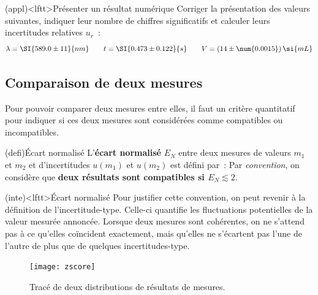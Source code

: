 \documentclass[../../main/main.tex]{subfiles}
\begin{document}
\begin{tcb*}(appl)<lftt>{Présenter un résultat numérique}
	Corriger la présentation des valeurs suivantes, indiquer leur nombre de
	chiffres significatifs et calculer leurs incertitudes relatives $u_r$~:
	\[
		\lambda = \SI{589.0\pm11}{nm}
		\qquad
		t = \SI{0.473 \pm 0.122}{s}
		\qquad
		V = (14 \pm \num{0.0015})\,\si{mL}
	\]
	\tcblower
\end{tcb*}

\subsection{Comparaison de deux mesures}
Pour pouvoir comparer deux mesures entre elles, il faut un critère quantitatif
pour indiquer si ces deux mesures sont considérées comme compatibles ou
incompatibles.
\begin{tcb*}(defi){Écart normalisé}
	L'\textbf{écart normalisé} $E_N$ entre deux mesures de valeurs $m_1$ et $m_2$ et d'incertitudes
	$u(m_1)$ et $u(m_2)$ est défini par~:
	\psw{%
		\[
			\boxed{E_N = \frac{\abs{m_1-m_2}}{\sqrt{u(m_1)^{2} + u(m_2)^{2}}}}
		\]
	}%
	Par \textit{convention}, on considère que \textbf{deux résultats sont
		compatibles si $E_N \lesssim 2$}.
\end{tcb*}


\begin{tcb}(inte)<lftt>{Écart normalisé}
	Pour justifier cette convention, on peut revenir à la définition de
	l'incertitude-type. Celle-ci quantifie les fluctuations potentielles de la
	valeur mesurée annoncée. Lorsque deux mesures sont cohérentes, on ne s'attend
	pas à ce qu'elles coïncident exactement, mais qu'elles ne s'écartent pas l'une
	de l'autre de plus que de quelques incertitudes-type.
\end{tcb}

\begin{figure}[htbp]
	\centering
	\texttt{[image: zscore]}
	\caption{Tracé de deux distributions de résultats de mesures.}
	\label{fig:zscore}
\end{figure}
\end{document}
